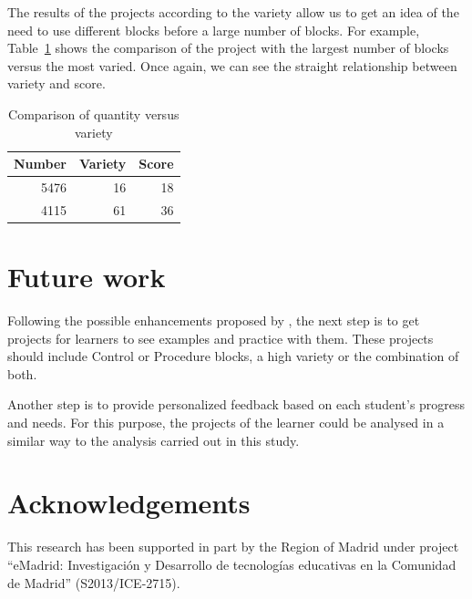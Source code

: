 \documentclass[a4paper]{article}
\begin{document}
The results of the projects according to the variety allow us to get an idea of the need to use different blocks before a large number of blocks. For example, Table~\ref{tab:comp-num-var} shows the comparison of the project with the largest number of blocks versus the most varied. Once again, we can see the straight relationship between variety and score.

\begin{table}
\begin{center}
\caption{Comparison of quantity versus variety}
\bigskip
\label{tab:comp-num-var}
\begin{tabular}{|r|r|r|}
\hline
Number & Variety & Score \\ \hline
5476 & 16 & 18\\ \hline
4115 & 61 & 36\\ \hline
\end{tabular}
\end{center}
\end{table}

\section{Future work}
Following the possible enhancements proposed by \cite{robles2018ontools}, the next step is to get projects for learners to see examples and practice with them. These projects should include Control or Procedure blocks, a high variety or the combination of both. 

Another step is to provide personalized feedback based on each student's progress and needs. For this purpose, the projects of the learner could be analysed in a similar way to the analysis carried out in this study.

\section*{Acknowledgements}
This research has been supported in part 
by the Region of Madrid under project ``eMadrid:
Investigación y Desarrollo de tecnologías educativas en la
Comunidad de Madrid'' (S2013/ICE-2715).


 

\end{document}
